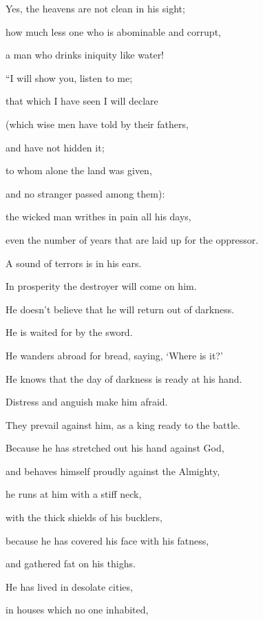 {\par }{\QB Yes, the heavens are not clean in his sight;
\par }{\Q {}how much less one who is abominable and corrupt,
\par }{\QB a man who drinks iniquity like water!
\par }{\BB \par }{\Q {}“I will show you, listen to me;
\par }{\QB that which I have seen I will declare
\par }{\Q {}(which wise men have told by their fathers,
\par }{\QB and have not hidden it;
\par }{\Q {}to whom alone the land was given,
\par }{\QB and no stranger passed among them):
\par }{\Q {}the wicked man writhes in pain all his days,
\par }{\QB even the number of years that are laid up for the oppressor.
\par }{\Q {}A sound of terrors is in his ears.
\par }{\QB In prosperity the destroyer will come on him.
\par }{\Q {}He doesn’t believe that he will return out of darkness.
\par }{\QB He is waited for by the sword.
\par }{\Q {}He wanders abroad for bread, saying, ‘Where is it?’
\par }{\QB He knows that the day of darkness is ready at his hand.
\par }{\Q {}Distress and anguish make him afraid.
\par }{\QB They prevail against him, as a king ready to the battle.
\par }{\Q {}Because he has stretched out his hand against God,
\par }{\QB and behaves himself proudly against the Almighty,
\par }{\Q {}he runs at him with a stiff neck,
\par }{\QB with the thick shields of his bucklers,
\par }{\Q {}because he has covered his face with his fatness,
\par }{\QB and gathered fat on his thighs.
\par }{\Q {}He has lived in desolate cities,
\par }{\QB in houses which no one inhabited,
}
